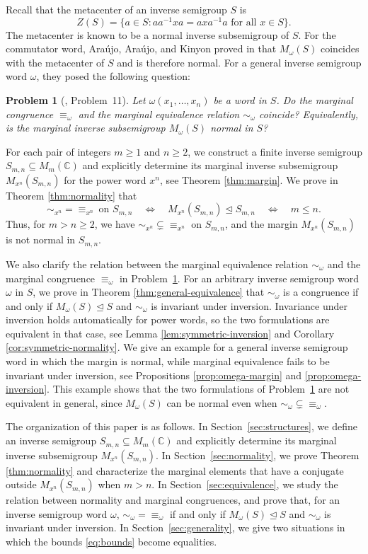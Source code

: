 \documentclass[11pt,a4paper,reqno]{amsart}
\newtheorem{problem}[theorem]{Problem}
\newcommand{\Sn}{S_{m,n}}
\newcommand{\Mn}{M_{x^n}}
\numberwithin{equation}{section}
\begin{document}
Recall that the metacenter of an inverse semigroup $S$ is
\[
Z(S)=\{a\in S: aa^{-1}xa=axa^{-1}a \text{ for all } x\in S\}.
\]
The metacenter is known to be a normal inverse subsemigroup of $S$. For the commutator word, Ara\'ujo, Ara\'ujo, and Kinyon proved in \cite[Theorem~2]{AAK} that $M_\omega(S)$ coincides with the metacenter of $S$ and is therefore normal.  For a general inverse semigroup word $\omega$, they posed the following question:

\begin{problem}[\cite{AAK}, Problem~11] \label{AAK-Problem11}
Let $\omega(x_1,\ldots,x_n)$ be a word in $S$. Do the marginal congruence $\equiv_\omega$ and the marginal equivalence relation $\sim_\omega$ coincide? Equivalently, is the marginal inverse subsemigroup $M_\omega(S)$ normal in $S$?
\end{problem}


For each pair of integers $m\geq 1$ and $n\geq 2$, we construct a finite inverse semigroup $\Sn\subseteq M_m(\mathbb C)$ and explicitly determine its marginal inverse subsemigroup $\Mn(\Sn)$ for the power word $x^n$, see Theorem \ref{thm:margin}. We prove in Theorem \ref{thm:normality} that
\[
\sim_{x^n}=\equiv_{x^n}\ \text{on }\Sn \quad\Longleftrightarrow\quad \Mn(\Sn)\trianglelefteq\Sn \quad\Longleftrightarrow\quad m\leq n.
\]
Thus, for $m>n\geq 2$, we have $\sim_{x^n}\subsetneq\equiv_{x^n}$ on $\Sn$, and the margin $\Mn(\Sn)$ is not normal in $\Sn$.

We also clarify the relation between the marginal equivalence relation $\sim_\omega$ and the marginal congruence $\equiv_\omega$ in Problem~\ref{AAK-Problem11}. For an arbitrary inverse semigroup word $\omega$ in $S$, we prove in Theorem \ref{thm:general-equivalence} that $\sim_\omega$ is a congruence if and only if $M_\omega(S)\trianglelefteq S$ and $\sim_\omega$ is invariant under inversion. Invariance under inversion holds automatically for power words, so the two formulations are equivalent in that case, see Lemma \ref{lem:symmetric-inversion} and Corollary \ref{cor:symmetric-normality}. We give an example for a general inverse semigroup word in which the margin is normal, while marginal equivalence fails to be invariant under inversion, see Propositions \ref{prop:omega-margin} and \ref{prop:omega-inversion}. This example shows that the two formulations of Problem~\ref{AAK-Problem11} are not equivalent in general, since $M_\omega(S)$ can be normal even when $\sim_\omega\subsetneq\equiv_\omega$.


The organization of this paper is as follows. In Section~\ref{sec:structures}, we define an inverse semigroup $\Sn  \subseteq  M_m(\mathbb C)$ and explicitly determine its marginal inverse subsemigroup $\Mn(\Sn)$. In Section~\ref{sec:normality}, we prove Theorem \ref{thm:normality} and characterize the marginal elements that have a conjugate outside $\Mn(\Sn)$ when $m>n$. In Section~\ref{sec:equivalence}, we study the relation between normality and marginal congruences, and prove that, for an inverse semigroup word $\omega$,  $\sim_\omega=\equiv_\omega$ if and only if $M_\omega(S)\trianglelefteq S$ and  $\sim_\omega$ is invariant under inversion. In Section~\ref{sec:generality}, we give two situations in which the bounds \eqref{eq:bounds} become equalities.
\end{document}
